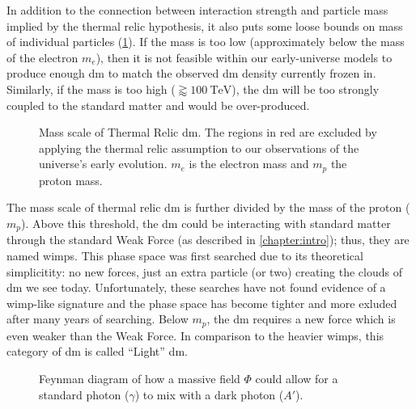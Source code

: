 In addition to the connection between interaction strength and particle mass implied by the thermal
relic hypothesis, it also puts some loose bounds on mass of individual particles
(\cref{fig:dm-mass-scale}). If the mass is too low (approximately below the mass of the electron
$m_e$), then it is not feasible within our early-universe models to produce enough \ac{dm} to match
the observed \ac{dm} density currently frozen in. Similarly, if the mass is too high ($\gtrapprox
  100~\text{TeV}$), the \ac{dm} will be too strongly coupled to the standard matter and would be
over-produced.

\begin{figure}
  \centering
  
  \caption{Mass scale of Thermal Relic \ac{dm}.
  The regions in red are excluded by applying the thermal relic assumption
  to our observations of the universe's early evolution.
  $m_e$ is the electron mass and $m_p$ the proton mass.
  }
  \label{fig:dm-mass-scale}
\end{figure}

The mass scale of thermal relic \ac{dm} is further divided by the mass of the proton ($m_p$). Above
this threshold, the \ac{dm} could be interacting with standard matter through the standard Weak
Force (as described in \cref{chapter:intro}); thus, they are named \acp{wimp}. This phase space was
first searched due to its theoretical simplicitity: no new forces, just an extra particle (or two)
creating the clouds of \ac{dm} we see today. Unfortunately, these searches have not found evidence
of a \ac{wimp}-like signature\cite{supercdms-2018,damic-2020,xenon1t-2018} and the phase space has
become tighter and more exluded after many years of searching. Below $m_p$, the \ac{dm} requires a
new force which is even weaker than the Weak Force. In comparison to the heavier \acp{wimp}, this
category of \ac{dm} is called ``Light'' \ac{dm}.

\begin{figure}
  \centering
  
  \caption{Feynman diagram of how a massive field $\Phi$ could allow for a standard photon ($\gamma$)
    to mix with a dark photon ($A'$).}
  \label{fig:photon-mixing}
\end{figure}

